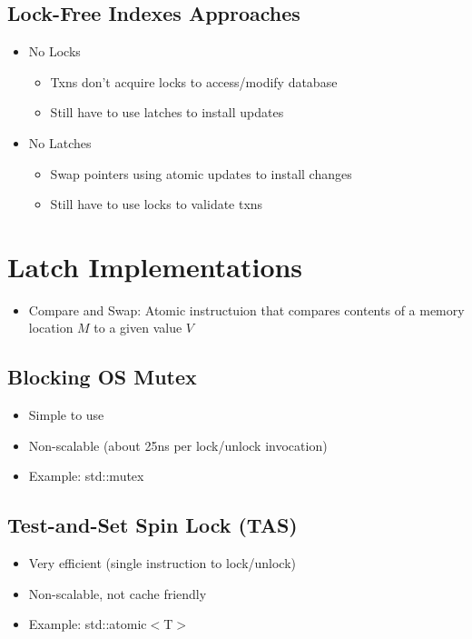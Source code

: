 \documentclass[11pt]{article}
\begin{document}
\subsection*{\textbf{Lock-Free Indexes Approaches}}
    \begin{itemize}
        \item No Locks
        \begin{itemize}
            \item Txns don't acquire locks to access/modify database
            \item Still have to use latches to install updates
        \end{itemize}
        \item No Latches
        \begin{itemize}
            \item Swap pointers using atomic updates to install changes
            \item Still have to use locks to validate txns
        \end{itemize}
    \end{itemize}

\section{Latch Implementations}
\begin{itemize}
    \item Compare and Swap: Atomic instructuion that compares contents of a memory location $M$ to a given value $V$
\end{itemize}
\subsection*{\textbf{Blocking OS Mutex}}
    \begin{itemize}
        \item Simple to use
        \item Non-scalable (about 25ns per lock/unlock invocation)
        \item Example: std::mutex
    \end{itemize}
\subsection*{\textbf{Test-and-Set Spin Lock (TAS)}}
    \begin{itemize}
        \item Very efficient (single instruction to lock/unlock)
        \item Non-scalable, not cache friendly
        \item Example: std::atomic$<$T$>$
    \end{itemize}
\end{document}
